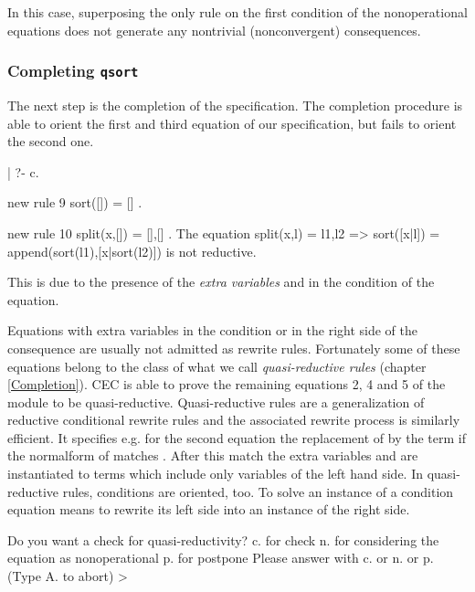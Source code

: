 In this case, superposing the only rule  on the first
condition of the nonoperational equations does not generate any nontrivial
(nonconvergent) consequences.

\subsubsection{Completing {\tt qsort}}

The next step is the completion of the  specification.
The completion procedure is able to orient the first and third 
equation of our specification, but fails to orient the second one.

\begin{screen}
| ?- c.

new rule   9    sort([]) = [] .

new rule  10    split(x,[]) = [],[] .
The equation
        split(x,l) = l1,l2 => sort([x|l]) = append(sort(l1),[x|sort(l2)])
is not reductive.
\end{screen}

\noindent
This is due to the presence of the {\em extra variables}  and 
in the condition of the equation.

Equations with extra variables in the condition or in the right side of
the consequence are usually not admitted as rewrite rules. 
Fortunately some of these equations belong to the class of what we call
{\em quasi-reductive rules} ( chapter \ref{Completion}). 
CEC is able to prove the remaining equations 2, 4
and 5 of the module  to be quasi-reductive.
Quasi-reductive rules are a generalization
of reductive conditional rewrite rules and the associated rewrite
process is similarly efficient.
It specifies e.g. for the second equation the replacement
of  by the term  
if the normalform of  matches .
After this match the extra variables  and  are instantiated to
terms which include only variables of the left hand side.
In quasi-reductive rules, conditions are oriented, too. To solve an instance
of a condition equation means to rewrite its left side into an instance of the
right side.

\begin{screen}
Do you want a check for quasi-reductivity?
c. for check
n. for considering the equation as nonoperational
p. for postpone
   Please answer with c. or n. or p. (Type A. to abort) >
\end{screen}

